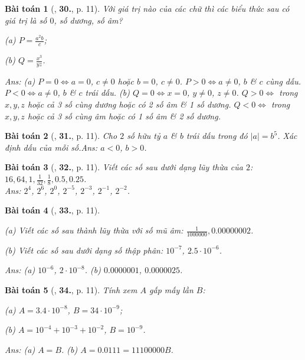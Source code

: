 \documentclass{article}
\numberwithin{equation}{section}
\newtheorem{baitoan}{Bài toán}
\begin{document}
\begin{baitoan}[\cite{Binh_Toan_7_tap_1}, \textbf{30.}, p. 11]
	Với giá trị nào của các chữ thì các biểu thức sau có giá trị là số $0$, số dương, số âm?
	\begin{enumerate*}
		\item[(a)] $P = \frac{a^2b}{c}$;
		\item[(b)] $Q = \frac{x^3}{yz}$.
	\end{enumerate*}\hfill\textsf{Ans:} (a) $P = 0\Leftrightarrow a = 0$, $c\ne 0$ hoặc $b = 0$, $c\ne 0$. $P > 0\Leftrightarrow a\ne 0$, $b$ \& $c$ cùng dấu. $P < 0\Leftrightarrow a\ne 0$, $b$ \& $c$ trái dấu. (b) $Q = 0\Leftrightarrow x = 0$, $y\ne 0$, $z\ne 0$. $Q > 0\Leftrightarrow$ trong $x,y,z$ hoặc cả 3 số cùng dương hoặc có 2 số âm \& 1 số dương. $Q < 0\Leftrightarrow$ trong $x,y,z$ hoặc cả 3 số cùng âm hoặc có 1 số âm \& 2 số dương.
\end{baitoan}

\begin{baitoan}[\cite{Binh_Toan_7_tap_1}, \textbf{31.}, p. 11]
	Cho $2$ số hữu tỷ $a$ \& $b$ trái dấu trong đó $|a| = b^5$. Xác định dấu của mỗi số.\hfill\textsf{Ans:} $a < 0$, $b > 0$.
\end{baitoan}

\begin{baitoan}[\cite{Binh_Toan_7_tap_1}, \textbf{32.}, p. 11]
	Viết các số sau dưới dạng lũy thừa của $2$: $16,64,1,\frac{1}{32},\frac{1}{8},0.5,0.25$.\\\mbox{}\hfill\textsf{Ans:} $2^4$, $2^6$, $2^0$, $2^{-5}$, $2^{-3}$, $2^{-1}$, $2^{-2}$.
\end{baitoan}

\begin{baitoan}[\cite{Binh_Toan_7_tap_1}, \textbf{33.}, p. 11]
	\begin{enumerate*}
		\item[(a)] Viết các số sau thành lũy thừa với số mũ âm: $\frac{1}{1000000},0.00000002$.
		\item[(b)] Viết các số sau dưới dạng số thập phân: $10^{-7}$, $2.5\cdot 10^{-6}$.
	\end{enumerate*}\hfill\textsf{Ans:} (a) $10^{-6}$, $2\cdot 10^{-8}$. (b) $0.000 0001$, $0.000 0025$.
\end{baitoan}

\begin{baitoan}[\cite{Binh_Toan_7_tap_1}, \textbf{34.}, p. 11]
	Tính xem $A$ gấp mấy lần $B$:
	\begin{enumerate*}
		\item[(a)] $A = 3.4\cdot 10^{-8}$, $B = 34\cdot 10^{-9}$;
		\item[(b)] $A = 10^{-4} + 10^{-3} + 10^{-2}$, $B = 10^{-9}$.
	\end{enumerate*}\hfill\textsf{Ans:} (a) $A = B$. (b) $A = 0.0111 = 11 100 000B$.
\end{baitoan}
\end{document}
